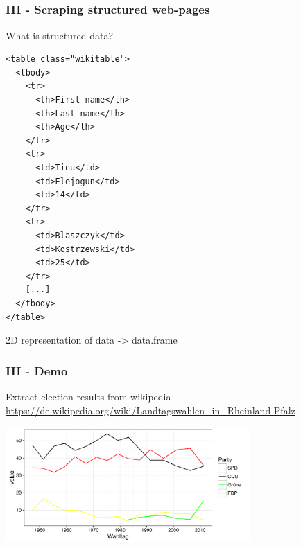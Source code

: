 \documentclass[12pt, t]{beamer}
\begin{document}
\subsection{}
\begin{frame}[fragile]
\frametitle{III - Scraping structured web-pages}
What is structured data?
\vspace{1em}
\begin{verbatim}
<table class="wikitable">
  <tbody>
    <tr>
      <th>First name</th>
      <th>Last name</th>
      <th>Age</th>
    </tr>
    <tr>
      <td>Tinu</td>
      <td>Elejogun</td>
      <td>14</td>
    </tr>
    <tr>
      <td>Blaszczyk</td>
      <td>Kostrzewski</td>
      <td>25</td>
    </tr>
    [...]
  </tbody>
</table>
\end{verbatim}
2D representation of data -> data.frame
\end{frame}


\begin{frame}
\frametitle{III - Demo}
Extract election results from wikipedia \\
\tiny
\url{https://de.wikipedia.org/wiki/Landtagswahlen_in_Rheinland-Pfalz}

\vspace{1em}
\begin{adjustbox}{max totalsize={.9\textwidth}{.7\textheight},center}
\end{adjustbox}
\vspace{2em}
\pause
\includegraphics[width=0.7\textwidth]{fig/p1.pdf}
\end{frame}
\end{document}
